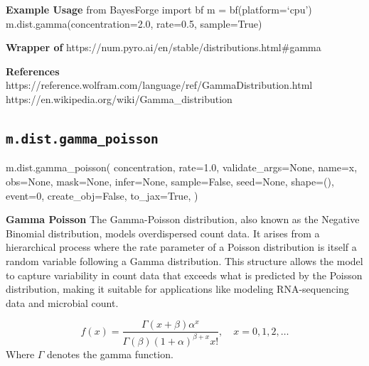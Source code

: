 \documentclass[
  letterpaper,
  DIV=11,
  numbers=noendperiod]{scrartcl}
\newenvironment{Shaded}{\begin{snugshade}}{\end{snugshade}}
\newcommand{\DecValTok}[1]{\textcolor[rgb]{0.68,0.00,0.00}{#1}}
\newcommand{\FloatTok}[1]{\textcolor[rgb]{0.68,0.00,0.00}{#1}}
\newcommand{\NormalTok}[1]{\textcolor[rgb]{0.00,0.23,0.31}{#1}}
\newcommand{\OperatorTok}[1]{\textcolor[rgb]{0.37,0.37,0.37}{#1}}
\newcommand{\StringTok}[1]{\textcolor[rgb]{0.13,0.47,0.30}{#1}}
\newcommand{\VariableTok}[1]{\textcolor[rgb]{0.07,0.07,0.07}{#1}}
\begin{document}
\textbf{Example Usage} from BayesForge import bf m = bf(platform=`cpu')
m.dist.gamma(concentration=2.0, rate=0.5, sample=True)

\textbf{Wrapper of}
https://num.pyro.ai/en/stable/distributions.html\#gamma

\textbf{References}
https://reference.wolfram.com/language/ref/GammaDistribution.html
https://en.wikipedia.org/wiki/Gamma\_distribution

\subsection{\texorpdfstring{\texttt{m.dist.gamma\_poisson}}{m.dist.gamma\_poisson}}\label{gamma_poisson}

\begin{Shaded}
\begin{Highlighting}[]
\NormalTok{m.dist.gamma\_poisson(}
\NormalTok{    concentration,}
\NormalTok{    rate}\OperatorTok{=}\FloatTok{1.0}\NormalTok{,}
\NormalTok{    validate\_args}\OperatorTok{=}\VariableTok{None}\NormalTok{,}
\NormalTok{    name}\OperatorTok{=}\StringTok{\textquotesingle{}x\textquotesingle{}}\NormalTok{,}
\NormalTok{    obs}\OperatorTok{=}\VariableTok{None}\NormalTok{,}
\NormalTok{    mask}\OperatorTok{=}\VariableTok{None}\NormalTok{,}
\NormalTok{    infer}\OperatorTok{=}\VariableTok{None}\NormalTok{,}
\NormalTok{    sample}\OperatorTok{=}\VariableTok{False}\NormalTok{,}
\NormalTok{    seed}\OperatorTok{=}\VariableTok{None}\NormalTok{,}
\NormalTok{    shape}\OperatorTok{=}\NormalTok{(),}
\NormalTok{    event}\OperatorTok{=}\DecValTok{0}\NormalTok{,}
\NormalTok{    create\_obj}\OperatorTok{=}\VariableTok{False}\NormalTok{,}
\NormalTok{    to\_jax}\OperatorTok{=}\VariableTok{True}\NormalTok{,}
\NormalTok{)}
\end{Highlighting}
\end{Shaded}

\textbf{Gamma Poisson} The Gamma-Poisson distribution, also known as the
Negative Binomial distribution, models overdispersed count data. It
arises from a hierarchical process where the rate parameter of a Poisson
distribution is itself a random variable following a Gamma distribution.
This structure allows the model to capture variability in count data
that exceeds what is predicted by the Poisson distribution, making it
suitable for applications like modeling RNA-sequencing data and
microbial count.

\[
  f(x) = \frac{\Gamma(x + \beta) \alpha^x}{\Gamma(\beta)(1 + \alpha)^{\beta + x} x!}, \quad x = 0, 1, 2, \ldots
  \] Where \(\Gamma\) denotes the gamma function.
\end{document}

